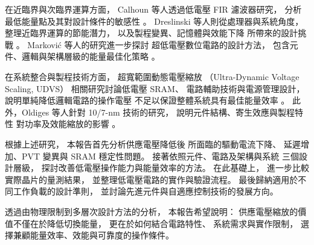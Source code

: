 在近臨界與次臨界運算方面，
Calhoun 等人透過低電壓 FIR 濾波器研究，
分析最低能量點及其對設計條件的敏感性
\cite{calhoun2005}。
Dreslinski 等人則從處理器與系統角度，
整理近臨界運算的節能潛力，
以及製程變異、記憶體與效能下降
所帶來的設計挑戰
\cite{dreslinski2010}。
Marković 等人的研究進一步探討
超低電壓數位電路的設計方法，
包含元件、邏輯與架構層級的能量最佳化策略
\cite{markovic2010}。

在系統整合與製程技術方面，
超寬範圍動態電壓縮放
（Ultra-Dynamic Voltage Scaling, UDVS）
相關研究討論低電壓 SRAM、
電路輔助技術與電源管理設計，
說明單純降低邏輯電路的操作電壓
不足以保證整體系統具有最佳能量效率
\cite{udvs2010}。
此外，Oldiges 等人針對
10/7-nm 技術的研究，
說明元件結構、寄生效應與製程特性
對功率及效能縮放的影響
\cite{oldiges2020}。

根據上述研究，
本報告首先分析供應電壓降低後
所面臨的驅動電流下降、
延遲增加、PVT 變異與 SRAM 穩定性問題。
接著依照元件、電路及架構與系統
三個設計層級，
探討改善低電壓操作能力與能量效率的方法。
在此基礎上，
進一步比較實際晶片的量測結果，
並整理低電壓電路的實作與驗證流程。
最後歸納適用於不同工作負載的設計準則，
並討論先進元件與自適應控制技術的發展方向。

透過由物理限制到多層次設計方法的分析，
本報告希望說明：
供應電壓縮放的價值不僅在於降低切換能量，
更在於如何結合電路特性、
系統需求與實作限制，
選擇兼顧能量效率、效能與可靠度的操作條件。

